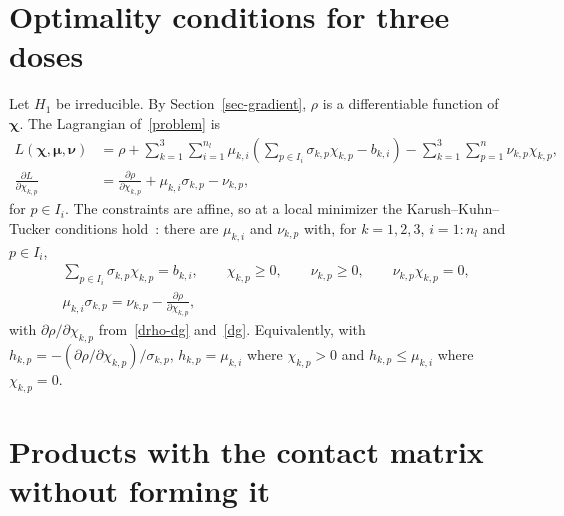 \documentclass[11pt]{article}
\theoremstyle{plain}
\theoremstyle{remark}
\numberwithin{equation}{section}
\begin{document}
\appendix
\section{Optimality conditions for three doses}\label{sec-kkt3}

Let $H_1$ be irreducible. By Section~\ref{sec-gradient}, $\rho$ is a
differentiable function of $\bm\chi$. The Lagrangian of~\eqref{problem} is
\begin{equation*}
\begin{aligned}
L(\bm\chi,\bm\mu,\bm\nu)&=\rho
+\sum_{k=1}^3\sum_{i=1}^{n_l}\mu_{k,i}\left(\sum_{p\in I_i}\sigma_{k,p}\chi_{k,p}-b_{k,i}\right)
-\sum_{k=1}^3\sum_{p=1}^n\nu_{k,p}\chi_{k,p},\\
\frac{\partial L}{\partial\chi_{k,p}}&=\frac{\partial\rho}{\partial\chi_{k,p}}
+\mu_{k,i}\sigma_{k,p}-\nu_{k,p},
\end{aligned}
\end{equation*}
for $p\in I_i$. The constraints are affine, so at a local minimizer the
Karush--Kuhn--Tucker conditions hold~\cite[Section~3.4]{1999Bertsekas}: there
are $\mu_{k,i}$ and $\nu_{k,p}$ with, for $k=1,2,3$, $i=1:n_l$ and $p\in I_i$,
\begin{equation}\label{kkt3}
\begin{aligned}
&\sum_{p\in I_i}\sigma_{k,p}\chi_{k,p}=b_{k,i},\qquad \chi_{k,p}\ge 0,\qquad
\nu_{k,p}\ge 0,\qquad \nu_{k,p}\chi_{k,p}=0,\\
&\mu_{k,i}\sigma_{k,p}=\nu_{k,p}-\frac{\partial\rho}{\partial\chi_{k,p}},
\end{aligned}
\end{equation}
with $\partial\rho/\partial\chi_{k,p}$ from~\eqref{drho-dg} and~\eqref{dg}.
Equivalently, with $h_{k,p}=-\left(\partial\rho/\partial\chi_{k,p}\right)/\sigma_{k,p}$,
$h_{k,p}=\mu_{k,i}$ where $\chi_{k,p}>0$ and $h_{k,p}\le\mu_{k,i}$ where
$\chi_{k,p}=0$.

\section{Products with the contact matrix without forming it}\label{app-factored}
\end{document}
